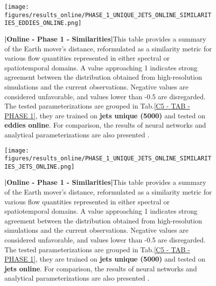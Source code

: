 %
%
\newpage

\begin{figure}[H]
    \centering
    \texttt{[image: figures/results\_online/PHASE\_1\_UNIQUE\_JETS\_ONLINE\_SIMILARITIES\_EDDIES\_ONLINE.png]}
    \caption{\textbf{|}\textcolor{section_color}{\textbf{Online - Phase 1 - Similarities}}\textbf{|}This table provides a summary of the Earth mover's distance, reformulated as a similarity metric for various flow quantities represented in either spectral or spatiotemporal domains. A value approaching 1 indicates strong agreement between the distribution obtained from high-resolution simulations and the current observations. Negative values are considered unfavorable, and values lower than -0.5 are disregarded. The tested parameterizations are grouped in Tab.\ref{C5 - TAB - PHASE 1}, they are trained on \textbf{jets unique (5000)} and tested on \textbf{eddies online}. For comparison, the results of neural networks \citep{Benchmarking} and analytical parameterizations are also presented \citep{ClosureAnalytical2, ClosureAnalytical51, ClosureDataDrivenZanna}.}
    \label{APP - ONLINE - PHASE 1 - SIMILARITIES -  JETS UNIQUE 5000 and EDDIES ONLINE}
\end{figure}

\newpage

\begin{figure}[H]
    \centering
    \texttt{[image: figures/results\_online/PHASE\_1\_UNIQUE\_JETS\_ONLINE\_SIMILARITIES\_JETS\_ONLINE.png]}
    \caption{\textbf{|}\textcolor{section_color}{\textbf{Online - Phase 1 - Similarities}}\textbf{|}This table provides a summary of the Earth mover's distance, reformulated as a similarity metric for various flow quantities represented in either spectral or spatiotemporal domains. A value approaching 1 indicates strong agreement between the distribution obtained from high-resolution simulations and the current observations. Negative values are considered unfavorable, and values lower than -0.5 are disregarded. The tested parameterizations are grouped in Tab.\ref{C5 - TAB - PHASE 1}, they are trained on \textbf{jets unique (5000)} and tested on \textbf{jets online}. For comparison, the results of neural networks \citep{Benchmarking} and analytical parameterizations are also presented \citep{ClosureAnalytical2, ClosureAnalytical51, ClosureDataDrivenZanna}.}
    \label{APP - ONLINE - PHASE 1 - SIMILARITIES -  JETS UNIQUE 5000 and JETS ONLINE}
\end{figure}

